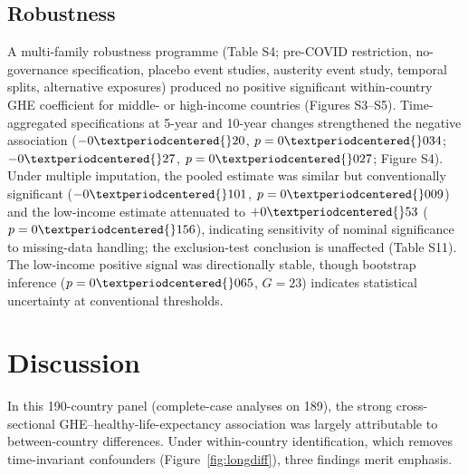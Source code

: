 \documentclass[12pt,a4paper]{article}
\begin{document}
\subsection*{Robustness}

A multi-family robustness programme (Table S4; pre-COVID restriction, no-governance specification, placebo event studies, austerity event study, temporal splits, alternative exposures) produced no positive significant within-country GHE coefficient for middle- or high-income countries (Figures S3--S5). Time-aggregated specifications at 5-year and 10-year changes strengthened the negative association ($-0{\textperiodcentered{}}20$, $p = 0{\textperiodcentered{}}034$; $-0{\textperiodcentered{}}27$, $p = 0{\textperiodcentered{}}027$; Figure S4). Under multiple imputation, the pooled estimate was similar but conventionally significant ($-0{\textperiodcentered{}}101$, $p = 0{\textperiodcentered{}}009$) and the low-income estimate attenuated to $+0{\textperiodcentered{}}53$ ($p = 0{\textperiodcentered{}}156$), indicating sensitivity of nominal significance to missing-data handling; the exclusion-test conclusion is unaffected (Table S11). The low-income positive signal was directionally stable, though bootstrap inference ($p = 0{\textperiodcentered{}}065$, $G = 23$) indicates statistical uncertainty at conventional thresholds.


\section*{Discussion}

In this 190-country panel (complete-case analyses on 189), the strong cross-sectional GHE--healthy-life-expectancy association was largely attributable to between-country differences. Under within-country identification, which removes time-invariant confounders (Figure~\ref{fig:longdiff}), three findings merit emphasis.
\end{document}
